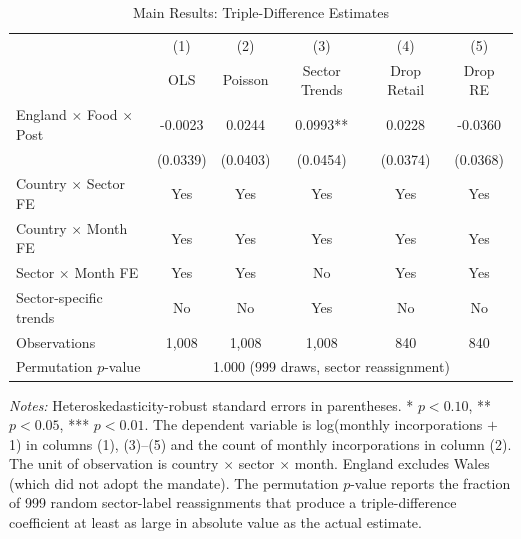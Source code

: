 \begin{table}[H]
\centering
\caption{Main Results: Triple-Difference Estimates}
\label{tab:main}
\begin{threeparttable}
\begin{tabular}{lccccc}
\toprule
& (1) & (2) & (3) & (4) & (5) \\
& OLS & Poisson & Sector Trends & Drop Retail & Drop RE \\
\midrule
England $\times$ Food $\times$ Post & -0.0023 & 0.0244 & 0.0993** & 0.0228 & -0.0360 \\
& (0.0339) & (0.0403) & (0.0454) & (0.0374) & (0.0368) \\
\addlinespace
Country $\times$ Sector FE & Yes & Yes & Yes & Yes & Yes \\
Country $\times$ Month FE & Yes & Yes & Yes & Yes & Yes \\
Sector $\times$ Month FE & Yes & Yes & No & Yes & Yes \\
Sector-specific trends & No & No & Yes & No & No \\
\addlinespace
Observations & 1,008 & 1,008 & 1,008 & 840 & 840 \\
Permutation $p$-value & \multicolumn{5}{c}{1.000 (999 draws, sector reassignment)} \\
\bottomrule
\end{tabular}
\begin{tablenotes}[flushleft]
\small
\item \textit{Notes:} Heteroskedasticity-robust standard errors in parentheses. * $p<0.10$, ** $p<0.05$, *** $p<0.01$. The dependent variable is log(monthly incorporations $+$ 1) in columns (1), (3)--(5) and the count of monthly incorporations in column (2). The unit of observation is country $\times$ sector $\times$ month. England excludes Wales (which did not adopt the mandate). The permutation $p$-value reports the fraction of 999 random sector-label reassignments that produce a triple-difference coefficient at least as large in absolute value as the actual estimate.
\end{tablenotes}
\end{threeparttable}
\end{table}
